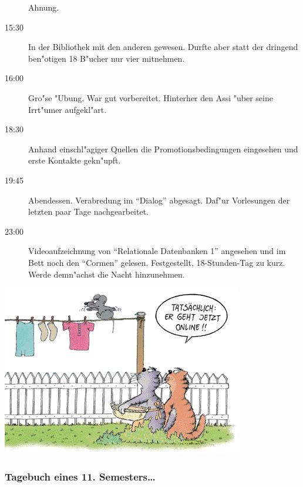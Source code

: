 \begin{description}
Ahnung.
\item[15:30] In der Bibliothek mit den anderen gewesen. Durfte aber statt der
dringend ben"otigen 18 B"ucher nur vier mitnehmen.
\item[16:00] Gro"se "Ubung. War gut vorbereitet. Hinterher den Assi "uber seine
Irrt"umer aufgekl"art.
\item[18:30] Anhand einschl"agiger Quellen die Promotionsbedingungen eingesehen und
erste Kontakte gekn"upft.
\item[19:45] Abendessen. Verabredung im "`Dialog"' abgesagt. Daf"ur Vorlesungen
der letzten paar Tage nachgearbeitet.
\item[23:00] Videoaufzeichnung von "`Relationale Datenbanken 1"' angesehen und im Bett noch den "`Cormen"'
gelesen. Festgestellt, 18-Stunden-Tag zu kurz. Werde demn"achst die Nacht
hinzunehmen.
\end{description}
\begin{center}
  \includegraphics[width=\linewidth]{bilder/comics/stein1.png}
\end{center}
\newpage
\subsubsection{Tagebuch eines 11. Semesters\ldots}

